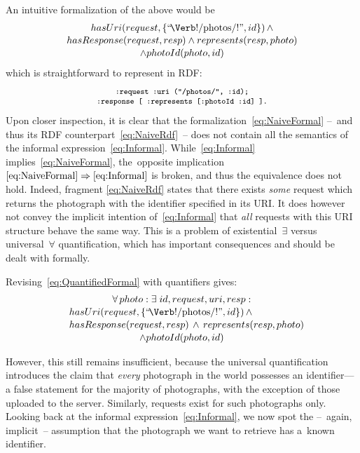 \documentclass[runningheads,a4paper, twocolumn]{llncs}
\begin{document}
\noindent An intuitive formalization of the above would be
\begin{multline}\label{eq:NaiveFormal}
	\makebox[5.2cm]{$hasUri(request, \{\mbox{``\!\Verb!/photos/!''}, id\})\, \land$} \\[-.2em]
	hasResponse(request, resp) \land represents(resp, photo)\\[-.2em]
	\land photoId(photo, id)
\end{multline}
which is straightforward to represent in RDF:
\begin{multline}\label{eq:NaiveRdf}
	\fontsize{8}{10}\texttt{:request :uri ("/photos/", :id);} \\[-.5em]
	\fontsize{8}{10}\texttt{:response [ :represents [:photoId :id] ].}
\end{multline}
Upon closer inspection, it is clear that the formalization~\ref{eq:NaiveFormal} --~and thus its RDF counterpart~\ref{eq:NaiveRdf}~-- does not contain all the semantics of the informal expression~\ref{eq:Informal}. While~\ref{eq:Informal} implies~\ref{eq:NaiveFormal}, the~opposite implication \mbox{$\ref{eq:NaiveFormal} \Rightarrow \ref{eq:Informal}$} is broken, and thus the equivalence does not hold. Indeed, fragment \ref{eq:NaiveRdf} states that there exists \emph{some} request which returns the photograph with the identifier specified in its URI. It does however not convey the implicit intention of~\ref{eq:Informal} that \emph{all} requests with this URI structure behave the same way. This is a problem of existential~$\exists$ versus universal~$\forall$ quantification, which has important consequences and should be dealt with formally.

Revising~\ref{eq:QuantifiedFormal} with quantifiers gives:
\begin{multline}\label{eq:QuantifiedFormal}
	\makebox[4.4cm]{$\forall\, photo : \exists\; id, request, uri, resp :$} \\[-.2em]
	\shoveleft{hasUri(request, \{\mbox{``\!\Verb!/photos/!''}, id\})\, \land} \\[-.2em]
	\shoveleft{hasResponse(request, resp) \,\land\, represents(resp, photo)}\\[-.2em]
	\land photoId(photo, id)
\end{multline}

\noindent However, this still remains insufficient, because the universal quantification introduces the claim that \emph{every} photograph in the world possesses an identifier---a false statement for the majority of photographs, with the exception of those uploaded to the server. Similarly, requests exist for such photographs only. Looking back at the informal expression~\ref{eq:Informal}, we now spot the --~again, implicit~-- assumption that the photograph we want to retrieve has a~known identifier.
\end{document}
